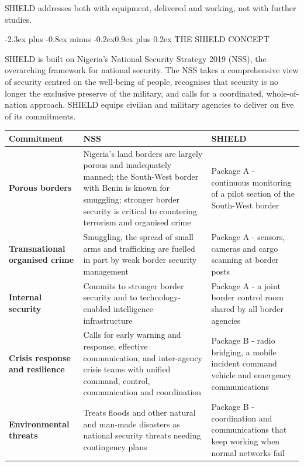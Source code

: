 \documentclass[10pt,letterpaper]{article}
\makeatletter
\renewcommand\section{\@startsection{section}{1}{0pt}%
  {-2.3ex plus -0.8ex minus -0.2ex}{0.9ex plus 0.2ex}%
  {\color{SDSSNavy}\large\bfseries}}
\makeatother
\begin{document}
SHIELD addresses both with equipment, delivered and working, not with further studies.

\section{THE SHIELD CONCEPT}

SHIELD is built on Nigeria's National Security Strategy 2019 (NSS), the overarching framework for national security. The NSS takes a comprehensive view of security centred on the well-being of people, recognises that security is no longer the exclusive preserve of the military, and calls for a coordinated, whole-of-nation approach. SHIELD equips civilian and military agencies to deliver on five of its commitments.

\renewcommand{\arraystretch}{1.22}
\begin{tabularx}{\textwidth}{@{}>{\RaggedRight\arraybackslash}p{1.55in}>{\RaggedRight\arraybackslash}p{3.10in}>{\RaggedRight\arraybackslash}X@{}}
\toprule
\textcolor{SDSSNavy}{\textbf{Commitment}} & \textcolor{SDSSNavy}{\textbf{NSS}} & \textcolor{SDSSNavy}{\textbf{SHIELD}} \\
\midrule
\textcolor{SDSSNavy}{\textbf{Porous borders}} & Nigeria's land borders are largely porous and inadequately manned; the South-West border with Benin is known for smuggling; stronger border security is critical to countering terrorism and organised crime & Package A - continuous monitoring of a pilot section of the South-West border \\
\textcolor{SDSSNavy}{\textbf{Transnational organised crime}} & Smuggling, the spread of small arms and trafficking are fuelled in part by weak border security management & Package A - sensors, cameras and cargo scanning at border posts \\
\textcolor{SDSSNavy}{\textbf{Internal security}} & Commits to stronger border security and to technology-enabled intelligence infrastructure & Package A - a joint border control room shared by all border agencies \\
\textcolor{SDSSNavy}{\textbf{Crisis response and resilience}} & Calls for early warning and response, effective communication, and inter-agency crisis teams with unified command, control, communication and coordination & Package B - radio bridging, a mobile incident command vehicle and emergency communications \\
\textcolor{SDSSNavy}{\textbf{Environmental threats}} & Treats floods and other natural and man-made disasters as national security threats needing contingency plans & Package B - coordination and communications that keep working when normal networks fail \\
\bottomrule
\end{tabularx}
\end{document}
